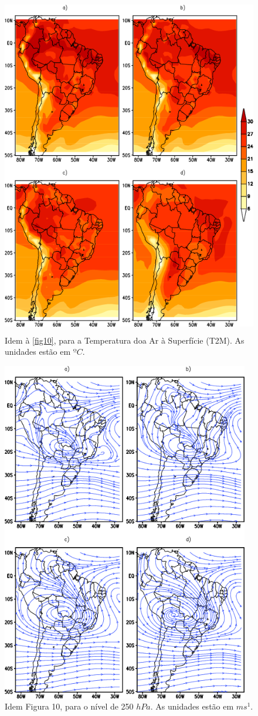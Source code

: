 \begin{figure}[!hbp]
\centering
\includegraphics[height=15cm]{./figs/media_tp2m_anl.png}
\caption{Idem à \autoref{fig10}, para a Temperatura doa Ar à Superfície (T2M). As unidades estão em $ºC$.}
\label{fig11}
\end{figure}

\begin{figure}[!hbp]
\centering
\includegraphics[height=15cm]{./figs/media_corrente_anl_250hPa.png}
\caption{Idem Figura 10, para o nível de 250 $hPa$. As unidades estão em $ms^{1}$.}
\label{fig12}
\end{figure}



